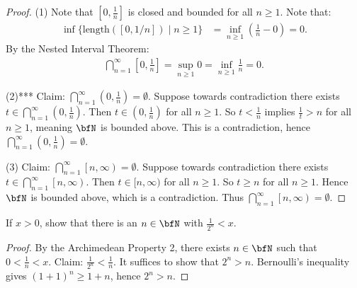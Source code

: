 \documentclass[10pt,twoside,openany]{memoir}
\begin{document}
        {\color{red} \begin{proof}
            (1) Note that $[0,\frac{1}{n}]$ is closed and bounded for all $n \geq 1$. Note that:
                \begin{equation*}
                \begin{split}
                    \inf \{\text{length}\left(\left[0,1/n\right]\right) \mid n \geq 1 \} 
                     &= \inf_{n \geq 1} \left(\frac{1}{n} - 0\right) 
                      = 0.
                \end{split}
                \end{equation*}
            By the Nested Interval Theorem:
                \begin{equation*}
                \begin{split}
                    \bigcap_{n=1}^\infty \left[0 , \frac{1}{n}\right] = \sup_{n \geq 1} 0 = \inf_{n \geq 1} \frac{1}{n} = 0.
                \end{split}
                \end{equation*}

            (2)*** Claim: $\bigcap_{n=1}^\infty \left(0, \frac{1}{n}\right) = \emptyset$. Suppose towards contradiction there exists $t \in \bigcap_{n=1}^\infty \left(0, \frac{1}{n}\right)$. Then $t \in \left(0 ,\frac{1}{n}\right)$ for all $n \geq 1$. So $t < \frac{1}{n}$ implies $\frac{1}{t} > n$ for all $n\geq 1$, meaning $\bfN$ is bounded above. This is a contradiction, hence $\bigcap_{n=1}^\infty \left(0, \frac{1}{n}\right) = \emptyset$.

            (3) Claim: $\bigcap_{n=1}^\infty \left[n, \infty\right) = \emptyset$. Suppose towards contradiction there exists $t \in \bigcap_{n=1}^\infty \left[n, \infty\right)$. Then $t \in [n,\infty)$ for all $n \geq 1$. So $t \geq n$ for all $n \geq 1$. Hence $\bfN$ is bounded above, which is a contradiction. Thus $\bigcap_{n=1}^\infty \left[n, \infty\right) = \emptyset$.
        \end{proof}}
    \begin{exercise}
        If $x>0$, show that there is an $n \in \bfN$ with $\frac{1}{2^n} <x$.
    \end{exercise}
        {\color{red} \begin{proof}
            By the Archimedean Property 2, there exists $n \in \bfN$ such that $0 < \frac{1}{n} < x$. Claim: $\frac{1}{2^n} < \frac{1}{n}$. It suffices to show that $2^n > n$. Bernoulli's inequality gives $(1+1)^n \geq 1 + n$, hence $2^n > n$.
        \end{proof}}
\end{document}
